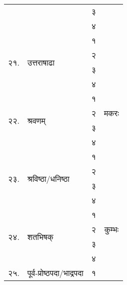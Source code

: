 \begin{longtable}{|l@{~}l|>{\tiny}c|c|}
  &                                        & ३            &                         \\*
  &                                        & ४            &                         \\*
  \cline{1-3}\multirow{4}{*}{२१.} & \multirow{4}{*}{उत्तराषाढा}             & १            &                         \\*
  \cline{3-4}                     &                                        & २            & \multirow{9}{*}{मकरः}   \\*
  &                                        & ३            &                         \\*
  &                                        & ४            &                         \\*
  \cline{1-3}\multirow{4}{*}{२२.} & \multirow{4}{*}{श्रवणम्}                 & १            &                         \\*
  &                                        & २            &                         \\*
  &                                        & ३            &                         \\*
  &                                        & ४            &                         \\*
  \cline{1-3}\multirow{4}{*}{२३.} & \multirow{4}{*}{श्रविष्ठा/धनिष्ठा}        & १            &                         \\*
  &                                        & २            &                         \\*
  \cline{3-4}                     &                                        & ३            & \multirow{9}{*}{कुम्भः}   \\*
  &                                        & ४            &                         \\*
  \cline{1-3}\multirow{4}{*}{२४.} & \multirow{4}{*}{शतभिषक्}                & १            &                         \\*
  &                                        & २            &                         \\*
  &                                        & ३            &                         \\*
  &                                        & ४            &                         \\*
  \cline{1-3}\multirow{4}{*}{२५.} & \multirow{4}{*}{पूर्व-प्रोष्ठपदा/भाद्रपदा}  & १            &                         \\*

\end{longtable}
